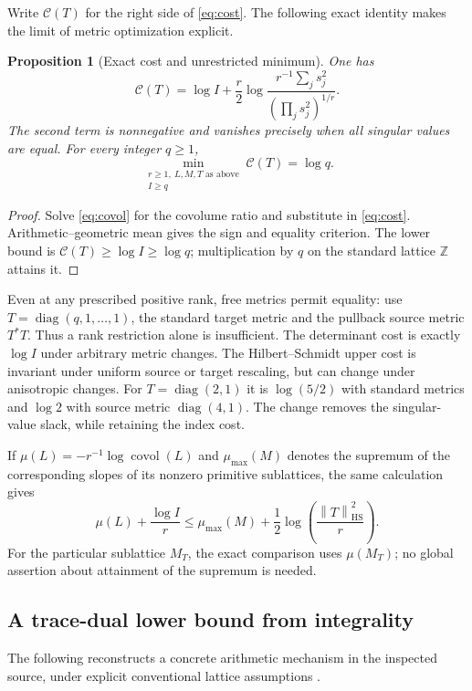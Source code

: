 \documentclass[11pt,letterpaper]{article}
\newtheorem{proposition}[theorem]{Proposition}
\theoremstyle{definition}
\theoremstyle{remark}
\newcommand{\Z}{\mathbb Z}
\newcommand{\covol}{\operatorname{covol}}
\newcommand{\HS}{\mathrm{HS}}
\newcommand{\norm}[1]{\left\lVert#1\right\rVert}
\numberwithin{equation}{section}
\begin{document}
Write $\mathcal C(T)$ for the right side of \eqref{eq:cost}. The following exact identity makes the limit of metric optimization explicit.

\begin{proposition}[Exact cost and unrestricted minimum]\label{prop:minimum}
One has
\[
 \mathcal C(T)=\log I+
 \frac r2\log\frac{r^{-1}\sum_js_j^2}{(\prod_js_j^2)^{1/r}}.
\]
The second term is nonnegative and vanishes precisely when all singular values are equal. For every integer $q\ge1$,
\[
 \min_{\substack{r\ge1,\ L,M,T\text{ as above}\\I\ge q}}\mathcal C(T)=\log q.
\]
\end{proposition}
\begin{proof}
Solve \eqref{eq:covol} for the covolume ratio and substitute in \eqref{eq:cost}. Arithmetic--geometric mean gives the sign and equality criterion. The lower bound is $\mathcal C(T)\ge\log I\ge\log q$; multiplication by $q$ on the standard lattice $\Z$ attains it.
\end{proof}

Even at any prescribed positive rank, free metrics permit equality: use $T=\operatorname{diag}(q,1,\ldots,1)$, the standard target metric and the pullback source metric $T^*T$. Thus a rank restriction alone is insufficient. The determinant cost is exactly $\log I$ under arbitrary metric changes. The Hilbert--Schmidt upper cost is invariant under uniform source or target rescaling, but can change under anisotropic changes. For $T=\operatorname{diag}(2,1)$ it is $\log(5/2)$ with standard metrics and $\log2$ with source metric $\operatorname{diag}(4,1)$. The change removes the singular-value slack, while retaining the index cost.

If $\mu(L)=-r^{-1}\log\covol(L)$ and $\mu_{\max}(M)$ denotes the supremum of the corresponding slopes of its nonzero primitive sublattices, the same calculation gives
\[
 \mu(L)+\frac{\log I}{r}
 \le\mu_{\max}(M)+\frac12\log\left(\frac{\norm T_{\HS}^2}{r}\right).
\]
For the particular sublattice $M_T$, the exact comparison uses $\mu(M_T)$; no global assertion about attainment of the supremum is needed.

\subsection{A trace-dual lower bound from integrality}
The following reconstructs a concrete arithmetic mechanism in the inspected source, under explicit conventional lattice assumptions \cite{normsource}.
\end{document}
